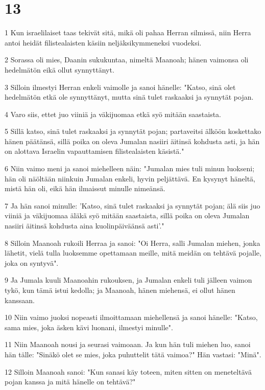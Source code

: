 \chapter{13}

\par 1 Kun israelilaiset taas tekivät sitä, mikä oli pahaa Herran silmissä, niin Herra antoi heidät filistealaisten käsiin neljäksikymmeneksi vuodeksi.
\par 2 Sorassa oli mies, Daanin sukukuntaa, nimeltä Maanoah; hänen vaimonsa oli hedelmätön eikä ollut synnyttänyt.
\par 3 Silloin ilmestyi Herran enkeli vaimolle ja sanoi hänelle: "Katso, sinä olet hedelmätön etkä ole synnyttänyt, mutta sinä tulet raskaaksi ja synnytät pojan.
\par 4 Varo siis, ettet juo viiniä ja väkijuomaa etkä syö mitään saastaista.
\par 5 Sillä katso, sinä tulet raskaaksi ja synnytät pojan; partaveitsi älköön koskettako hänen päätänsä, sillä poika on oleva Jumalan nasiiri äitinsä kohdusta asti, ja hän on alottava Israelin vapauttamisen filistealaisten käsistä."
\par 6 Niin vaimo meni ja sanoi miehelleen näin: "Jumalan mies tuli minun luokseni; hän oli näöltään niinkuin Jumalan enkeli, hyvin peljättävä. En kysynyt häneltä, mistä hän oli, eikä hän ilmaissut minulle nimeänsä.
\par 7 Ja hän sanoi minulle: 'Katso, sinä tulet raskaaksi ja synnytät pojan; älä siis juo viiniä ja väkijuomaa äläkä syö mitään saastaista, sillä poika on oleva Jumalan nasiiri äitinsä kohdusta aina kuolinpäiväänsä asti'."
\par 8 Silloin Maanoah rukoili Herraa ja sanoi: "Oi Herra, salli Jumalan miehen, jonka lähetit, vielä tulla luoksemme opettamaan meille, mitä meidän on tehtävä pojalle, joka on syntyvä".
\par 9 Ja Jumala kuuli Maanoahin rukouksen, ja Jumalan enkeli tuli jälleen vaimon tykö, kun tämä istui kedolla; ja Maanoah, hänen miehensä, ei ollut hänen kanssaan.
\par 10 Niin vaimo juoksi nopeasti ilmoittamaan miehellensä ja sanoi hänelle: "Katso, sama mies, joka äsken kävi luonani, ilmestyi minulle".
\par 11 Niin Maanoah nousi ja seurasi vaimoaan. Ja kun hän tuli miehen luo, sanoi hän tälle: "Sinäkö olet se mies, joka puhuttelit tätä vaimoa?" Hän vastasi: "Minä".
\par 12 Silloin Maanoah sanoi: "Kun sanasi käy toteen, miten sitten on meneteltävä pojan kanssa ja mitä hänelle on tehtävä?"
